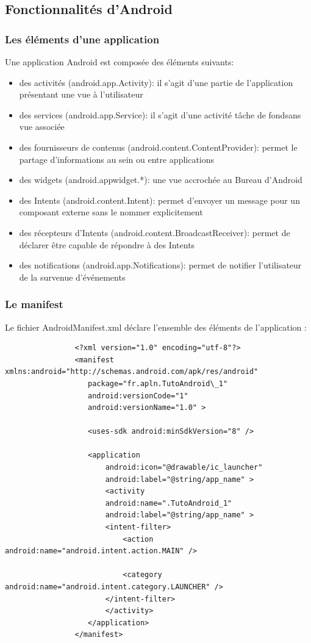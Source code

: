 \documentclass[a4paper]{report}
\begin{document}
		\subsection{Fonctionnalités d’Android}
			\subsubsection{Les éléments d’une application}
				Une application Android est composée des éléments suivants:\\
				\begin{itemize}
					\item des activités (android.app.Activity): il s'agit d'une partie de l'application présentant une vue à l'utilisateur
					\item des services (android.app.Service): il s'agit d'une activité tâche de fondsans vue associée
					\item des fournisseurs de contenus (android.content.ContentProvider): permet le partage d'informations au sein ou entre applications
					\item des widgets (android.appwidget.*): une vue accrochée au Bureau d'Android
					\item des Intents (android.content.Intent): permet d'envoyer un message pour un composant externe sans le nommer explicitement
					\item des récepteurs d'Intents (android.content.BroadcastReceiver): permet de déclarer être capable de répondre à des Intents
					\item des notifications (android.app.Notifications): permet de notifier l'utilisateur de la survenue d'événements
				\end{itemize}
			
			\subsubsection{Le manifest}
				Le fichier AndroidManifest.xml déclare l'ensemble des éléments de l'application :\\
				\begin{verbatim}
				<?xml version="1.0" encoding="utf-8"?>
				<manifest xmlns:android="http://schemas.android.com/apk/res/android"
				   package="fr.apln.TutoAndroid\_1"
				   android:versionCode="1"
				   android:versionName="1.0" >

				   <uses-sdk android:minSdkVersion="8" />

				   <application
				       android:icon="@drawable/ic_launcher"
				       android:label="@string/app_name" >
				       <activity
					   android:name=".TutoAndroid_1"
					   android:label="@string/app_name" >
					   <intent-filter>
					       <action android:name="android.intent.action.MAIN" />
						
					       <category android:name="android.intent.category.LAUNCHER" />
					   </intent-filter>
				       </activity>
				   </application>
				</manifest>
				\end{verbatim}
\end{document}
